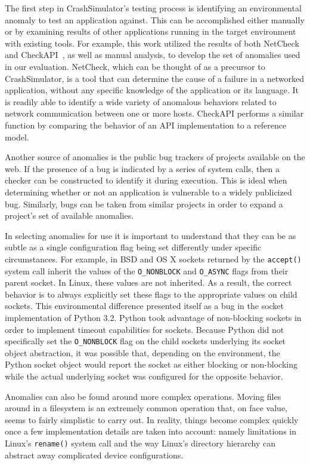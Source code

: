 The first step in CrashSimulator's testing process is identifying an
environmental anomaly to test an application against.  This can be
accomplished either manually or by examining results of other applications
running in the target environment with existing tools.  For example, this
work utilized the results of both NetCheck~\cite{Zhuang_NSDI_2014} and
CheckAPI~\cite{rasley2015detecting}, as well as manual analysis, to develop
the set of anomalies used in our evaluation.  NetCheck, which can be
thought of as a precursor to CrashSimulator, is a tool that can determine
the cause of a failure in a networked application, without any specific
knowledge of the application or its language. It is readily able to
identify a wide variety of anomalous behaviors related to network
communication between one or more hosts.  CheckAPI performs a similar
function by comparing the behavior of an API implementation to a reference
model.

Another source of anomalies is the public bug trackers of projects
available on the web.  If the presence of a bug is indicated by a series of
system calls, then a checker can be constructed to identify it during
execution. This is ideal when determining whether or not an application is
vulnerable to a widely publicized bug.  Similarly, bugs can be taken from
similar projects in order to expand a project's set of available anomalies.

In selecting anomalies for use it is important to understand that they can
be as subtle as a single configuration flag being set differently under
specific circumstances.  For example, in BSD and OS X sockets returned by
the {\tt accept()} system call inherit the values of the {\tt O\_NONBLOCK}
and {\tt O\_ASYNC} flags from their parent socket.  In Linux, these values
are not inherited.  As a result, the correct behavior is to always
explicitly set these flags to the appropriate values on child sockets.
This environmental difference presented itself as a bug in the socket
implementation of Python 3.2.  Python took advantage of non-blocking
sockets in order to implement timeout capabilities for sockets.  Because
Python did not specifically set the {\tt O\_NONBLOCK} flag on the child
sockets underlying its socket object abstraction, it was possible that,
depending on the environment, the Python socket object would report the
socket as either blocking or non-blocking while the actual underlying
socket was configured for the opposite behavior.

Anomalies can also be found around more complex operations.  Moving files
around in a filesystem is an extremely common operation that, on face
value, seems to fairly simplistic to carry out.  In reality, things become
complex quickly once a few implementation details are taken into account:
namely limitations in Linux's {\tt rename()} system call and the way
Linux's directory hierarchy can abstract away complicated device
configurations.

